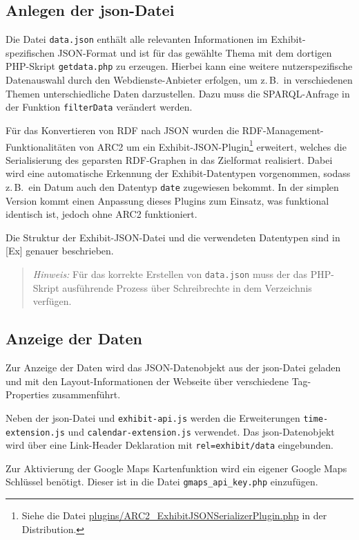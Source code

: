 \documentclass[11pt,a4paper]{article}
\begin{document}
\subsection{Anlegen der json-Datei}

Die Datei \texttt{data.json} enthält alle relevanten Informationen im
Exhibit-spezifischen JSON-Format und ist für das gewählte Thema mit dem
dortigen PHP-Skript \texttt{getdata.php} zu erzeugen.  Hierbei kann eine
weitere nutzerspezifische Datenauswahl durch den Webdienste-Anbieter erfolgen,
um z.\,B.\ in verschiedenen Themen unterschiedliche Daten darzustellen. Dazu
muss die SPARQL-Anfrage in der Funktion \texttt{filterData} verändert werden.

Für das Konvertieren von RDF nach JSON wurden die
RDF-Management-Funktionalitäten von ARC2 um ein
Exhibit-JSON-Plugin\footnote{Siehe die Datei
  \url{plugins/ARC2_ExhibitJSONSerializerPlugin.php} in der Distribution.}
erweitert, welches die Serialisierung des geparsten RDF-Graphen in das
Zielformat realisiert.  Dabei wird eine automatische Erkennung der
Exhibit-Datentypen vorgenommen, sodass z.\,B.\ ein Datum auch den Datentyp
\texttt{date} zugewiesen bekommt. In der simplen Version kommt einen Anpassung
dieses Plugins zum Einsatz, was funktional identisch ist, jedoch ohne ARC2
funktioniert.

Die Struktur der Exhibit-JSON-Datei und die verwendeten Datentypen sind in
[Ex] genauer beschrieben.
\begin{quote}
  \emph{Hinweis:} Für das korrekte Erstellen von \texttt{data.json} muss der
  das PHP-Skript ausführende Prozess über Schreibrechte in dem Verzeichnis
  verfügen.
\end{quote}

\subsection{Anzeige der Daten}

Zur Anzeige der Daten wird das JSON-Datenobjekt aus der json-Datei geladen und
mit den Layout-Informationen der Webseite über verschiedene Tag-Properties
zusammenführt.

Neben der json-Datei und \texttt{exhibit-api.js} werden die Erweiterungen
\texttt{time-extension.js} und \texttt{calendar-extension.js} verwendet.  Das
json-Datenobjekt wird über eine Link-Header Deklaration mit
\texttt{rel={\dq}exhibit/data{\dq}} eingebunden.

Zur Aktivierung der Google Maps Kartenfunktion wird ein eigener Google Maps
Schlüssel benötigt. Dieser ist in die Datei \texttt{gmaps\_api\_key.php}
einzufügen.
\end{document}

